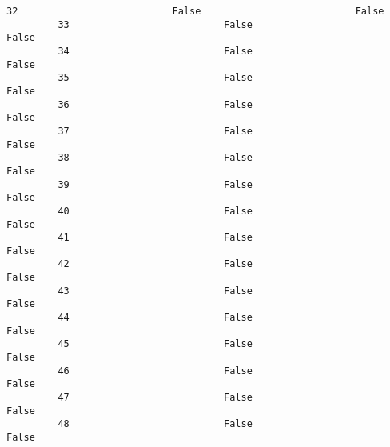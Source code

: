 \documentclass[11pt]{article}
\begin{document}
\begin{Verbatim}[commandchars=\\\{\}]
         32                           False                           False   
         33                           False                           False   
         34                           False                           False   
         35                           False                           False   
         36                           False                           False   
         37                           False                           False   
         38                           False                           False   
         39                           False                           False   
         40                           False                           False   
         41                           False                           False   
         42                           False                           False   
         43                           False                           False   
         44                           False                           False   
         45                           False                           False   
         46                           False                           False   
         47                           False                           False   
         48                           False                           False   
         

\end{Verbatim}
\end{document}
